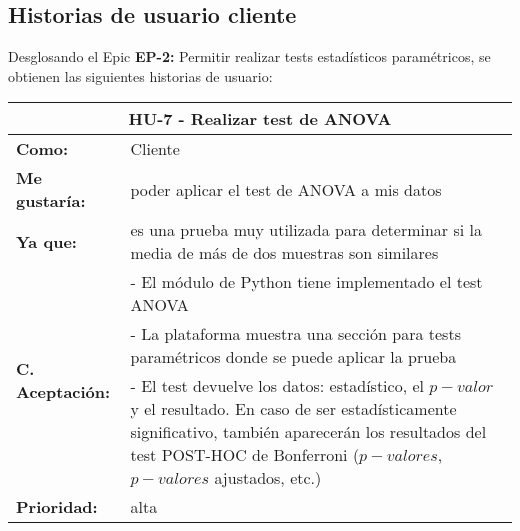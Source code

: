 \subsection{Historias de usuario cliente}


Desglosando el Epic \textbf{EP-2:} Permitir realizar tests estadísticos paramétricos, se obtienen las siguientes historias de usuario:

\begin{table}[H]
	\begin{tabular}{| p{3cm}| p{11cm} |}
		\hline
		\multicolumn{2}{|c|}{\textbf{HU-7} - Realizar test de ANOVA} \\ \hline
		\textbf{Como:} & Cliente \\ \hline
		\textbf{Me gustaría:} & poder aplicar el test de ANOVA a mis datos \\ \hline
		\textbf{Ya que:} & es una prueba muy utilizada para determinar si la media de más de dos muestras son similares \\ \hline
		\multirow{3}{11cm}{\textbf{C. Aceptación:}} & - El módulo de Python tiene implementado el test ANOVA \\
		& - La plataforma muestra una sección para tests paramétricos donde se puede aplicar la prueba \\
		& - El test devuelve los datos: estadístico, el $p-valor$ y el resultado. En caso de ser estadísticamente significativo, también aparecerán los resultados del test POST-HOC de Bonferroni ($p-valores$, $p-valores$ ajustados, etc.) \\ \hline
		\textbf{\textbf{Prioridad:}} & alta \\ \hline
	\end{tabular}
\end{table}


